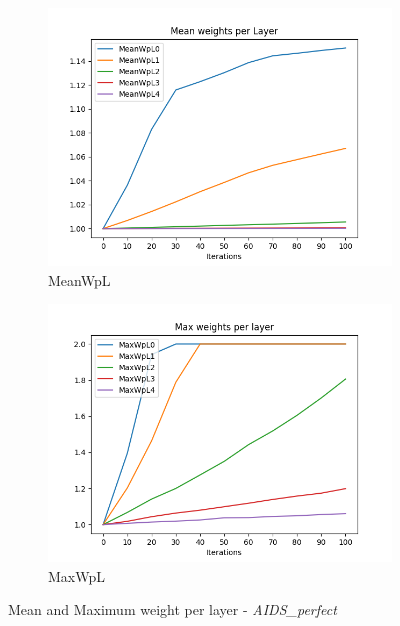 		\begin{figure}[H]
			\centering
			\begin{subfigure}{0.45\textwidth}
				\centering
				\includegraphics[width=1.1\linewidth]{images/plotA0_MeanWpL_AIDSPerfect_E_GDL_09_22h-03m}
				\caption{MeanWpL}
				\label{fig:plota0meanwplaidsperfectegdl0922h-03m}
			\end{subfigure}
			\begin{subfigure}{0.45\textwidth}
				\centering
				\includegraphics[width=1.1\linewidth]{images/plotA0_MaxWpL_AIDSPerfect_E_GDL_09_22h-03m}
				\caption{MaxWpL}
				\label{fig:plota0maxwplaidsperfectegdl0922h-03m}
			\end{subfigure}
			\caption{Mean and Maximum weight per layer - \textit{AIDS\_perfect}}
			\label{fig:MeanMaxWpLAIDSperfect}
		\end{figure}
	
